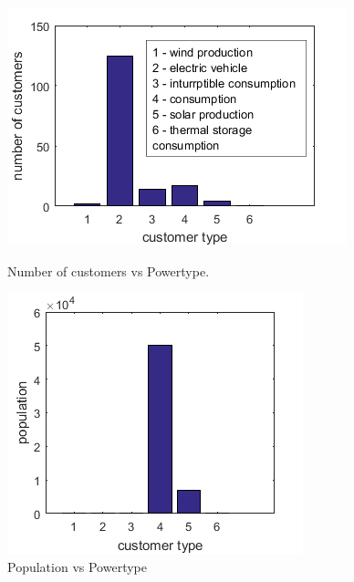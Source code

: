 \begin{figure}
\centering
\begin{minipage}{.5\textwidth}
  \centering
  \includegraphics[width=\linewidth]{4-customer-vs-powertype.jpg}
  \caption{Number of customers vs Powertype.}
  \label{fig:cust-pt}
\end{minipage}%
\begin{minipage}{.5\textwidth}
  \centering
  \includegraphics[width=\linewidth]{2-population-vs-powertype.jpg}
  \caption{Population vs Powertype}
  \label{fig:pop-pt}
\end{minipage}


\end{figure}
